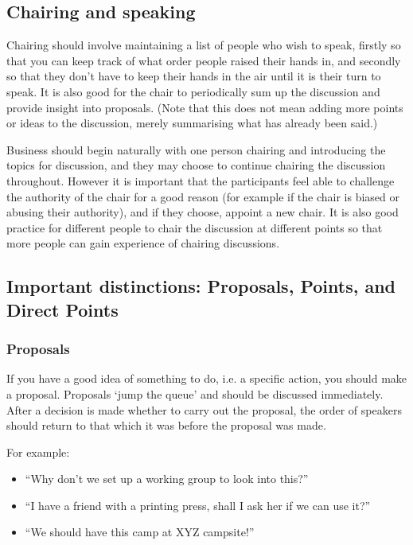 \documentclass[a4paper, 11pt]{article} %
\begin{document}
\subsection{Chairing and speaking}


Chairing should involve maintaining a list of people who wish to speak, firstly so that you can keep track of what order people raised their hands in, and secondly so that they don't have to keep their hands in the air until it is their turn to speak.  It is also good for the chair to periodically sum up the discussion and provide insight into proposals.  (Note that this does not mean adding more points or ideas to the discussion, merely summarising what has already been said.)

Business should begin naturally with one person chairing and introducing the topics for discussion, and they may choose to continue chairing the discussion throughout.  However it is important that the participants feel able to challenge the authority of the chair for a good reason (for example if the chair is biased or abusing their authority), and if they choose, appoint a new chair.  It is also good practice for different people to chair the discussion at different points so that more people can gain experience of chairing discussions.

\subsection{Important distinctions: Proposals, Points, and Direct Points}
\subsubsection{Proposals}
If you have a good idea of something to do, i.e. a specific action, you should make a proposal.  Proposals `jump the queue' and should be discussed immediately.  After a decision is made whether to carry out the proposal, the order of speakers should return to that which it was before the proposal was made.

For example:
\begin{itemize}
\item ``Why don't we set up a working group to look into this?''
\item ``I have a friend with a printing press, shall I ask her if we can use it?''
\item ``We should have this camp at XYZ campsite!''
\end{itemize}
\end{document}
